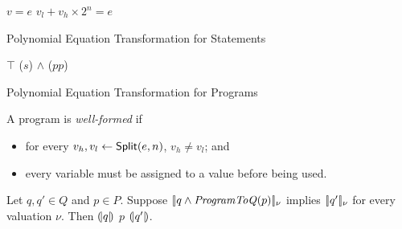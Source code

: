 
\begin{algorithm}
  \begin{algorithmic}[1]
        \Return $v = e$
      \EndCase
        \Return $v_l + v_h \times 2^n = e$
      \EndCase
    \EndMatch
    \EndFunction
  \end{algorithmic}
  \caption{Polynomial Equation Transformation for Statements}
\end{algorithm}

\begin{algorithm}
  \begin{algorithmic}[1]
      \Case{$\epsilon$} \Return $\top$ \EndCase
        \Return {} ($s$) $\wedge$
                 ($pp$)
      \EndCase
    \EndMatch
    \EndFunction
  \end{algorithmic}
  \caption{Polynomial Equation Transformation for Programs}
  \label{algorithm:programtoq}
\end{algorithm}

\begin{definition}
  A program is \emph{well-formed} if
  \begin{itemize}
  \item for every $v_h, v_l \leftarrow \mbox{\textsf{Split}}(e, n)$, $v_h
    \neq v_l$; and
  \item every variable must be assigned to a value before being used.
  \end{itemize}
\end{definition}

\begin{theorem}
  \label{theorem:program-to-q-soundness}
  Let $q, q' \in Q$ and $p \in P$.
  Suppose $[\!|{q \wedge \textmd{\textit{ProgramToQ}}(p)}|\!]_\nu$
  implies $[\!|{q'}|\!]_\nu$ for every valuation $\nu$. 
  Then ${(\!|}{q}{|\!)}$ $p$ ${(\!|}{q'}{|\!)}$.
\end{theorem}

